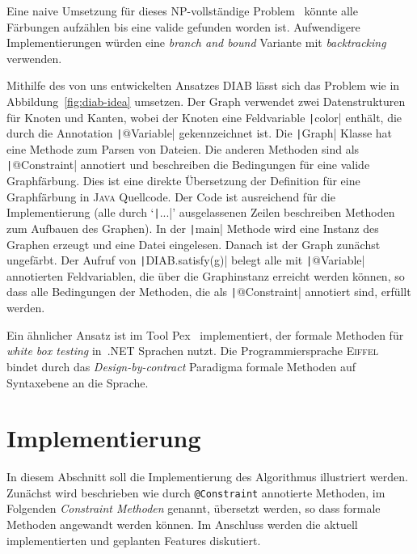 \documentclass[a4paper,fontsize=12pt,headings=small,captions=tableheading,%
numbers=endperiod,abstracton,pdftex]{scrartcl}
\begin{document}
Eine naive Umsetzung für dieses NP-vollständige Problem~\cite{Kar:72} könnte
alle Färbungen aufzählen bis eine valide gefunden worden ist.  Aufwendigere
Implementierungen würden eine \emph{branch and bound} Variante mit
\emph{backtracking} verwenden.

Mithilfe des von uns entwickelten Ansatzes \textsc{DIAB} lässt sich das Problem
wie in Abbildung~\ref{fig:diab-idea} umsetzen.  Der Graph verwendet zwei
Datenstrukturen für Knoten und Kanten, wobei der Knoten eine Feldvariable
\texttt|color| enthält, die durch die Annotation
\texttt|@Variable| gekennzeichnet ist.  Die \texttt|Graph|
Klasse hat eine Methode zum Parsen von Dateien.  Die anderen Methoden sind als
\texttt|@Constraint| annotiert und beschreiben die Bedingungen für
eine valide Graphfärbung.  Dies ist eine direkte Übersetzung der Definition für
eine Graphfärbung in \textsc{Java} Quellcode.  Der Code ist ausreichend für die
Implementierung (alle durch `\texttt|...|' ausgelassenen Zeilen
beschreiben Methoden zum Aufbauen des Graphen).  In der \texttt|main|
Methode wird eine Instanz des Graphen erzeugt und eine Datei eingelesen. Danach
ist der Graph zunächst ungefärbt.  Der Aufruf von
\texttt|DIAB.satisfy(g)| belegt alle mit \texttt|@Variable|
annotierten Feldvariablen, die über die Graphinstanz erreicht werden können, so
dass alle Bedingungen der Methoden, die als \texttt|@Constraint|
annotiert sind, erfüllt werden.

Ein ähnlicher Ansatz ist im Tool Pex~\cite{TS:05} implementiert, der formale
Methoden für \emph{white box testing} in~.NET Sprachen nutzt.  Die
Programmiersprache \textsc{Eiffel}~\cite{Meyer:88} bindet durch das
\emph{Design-by-contract} Paradigma formale Methoden auf Syntaxebene an die
Sprache.

\section{Implementierung}
In diesem Abschnitt soll die Implementierung des Algorithmus illustriert werden.
Zunächst wird beschrieben wie durch \texttt{@Constraint} annotierte
Methoden, im Folgenden \emph{Constraint Methoden} genannt, übersetzt werden, so
dass formale Methoden angewandt werden können.  Im Anschluss werden die aktuell
implementierten und geplanten Features diskutiert.
\end{document}

